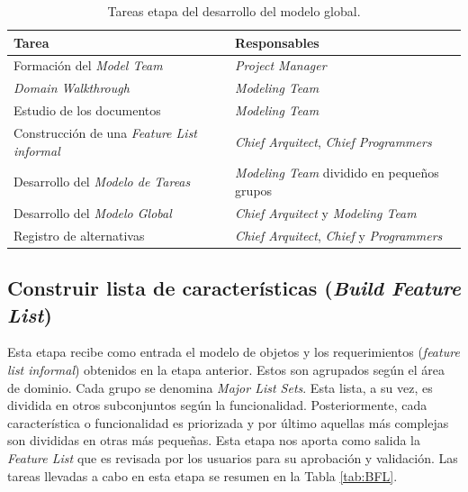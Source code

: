 \documentclass[11pt]{article}
\begin{document}
\begin{table}[H]
  \centering
\begin{tabular}{ |p{6cm}|p{6cm}|  }
	\hline
	Tarea & Responsables \\
	\hline
	Formación del
	\textit{Model Team}  &    \textit{Project
		Manager}\\
	
	\textit{Domain Walkthrough}  &    \textit{Modeling Team}\\
	
	Estudio de los documentos     &    \textit{Modeling Team}\\
	
	Construcción de una \textit{Feature List informal}  &    \textit{Chief Arquitect}, \textit{Chief Programmers}\\
	Desarrollo del \textit{Modelo de Tareas} & \textit{Modeling Team} dividido en pequeños grupos\\
	Desarrollo del \textit{Modelo Global}  &  \textit{Chief Arquitect} y \textit{Modeling Team}\\
	Registro de alternativas    & \textit{Chief Arquitect}, \textit{Chief} y \textit{Programmers}\\
	\hline
\end{tabular}
\caption{Tareas etapa del desarrollo del modelo global.}\label{tab:DOM}
\end{table}

\subsection {Construir lista de características (\textit{Build Feature List})}

Esta etapa recibe como entrada el modelo de objetos y los requerimientos (\textit{feature list informal}) obtenidos en la etapa anterior. Estos son agrupados según el área de dominio. Cada grupo se denomina \textit{Major List Sets}. Esta lista, a su vez, es dividida en otros subconjuntos según la funcionalidad. Posteriormente, cada característica o funcionalidad es priorizada y por último aquellas más complejas son divididas en otras más pequeñas. Esta etapa nos aporta como salida la \textit{Feature List} que es revisada por los usuarios para su aprobación y validación. Las tareas llevadas a cabo en esta etapa se resumen en la Tabla \ref{tab:BFL}. \\
\end{document}
